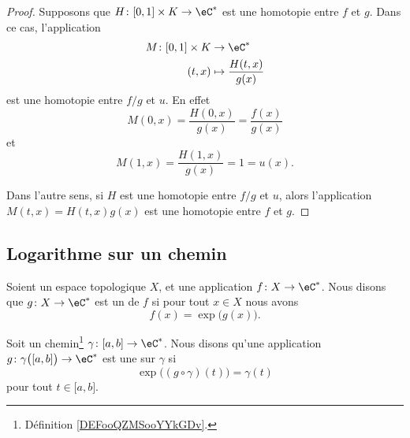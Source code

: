 \begin{proof}
    Supposons que \( H\colon \mathopen[ 0 , 1 \mathclose]\times K\to \eC^*\) est une homotopie entre \( f\) et \( g\). Dans ce cas, l'application
    \begin{equation}
        \begin{aligned}
            M\colon \mathopen[ 0 , 1 \mathclose]\times K&\to \eC^* \\
            (t,x)&\mapsto \frac{ H(t,x) }{ g(x) } 
        \end{aligned}
    \end{equation}
    est une homotopie entre \( f/g\) et \( u\). En effet
    \begin{equation}
        M(0,x)=\frac{ H(0,x) }{ g(x) }=\frac{ f(x) }{ g(x) }
    \end{equation}
    et
    \begin{equation}
        M(1,x)=\frac{ H(1,x) }{ g(x) }=1=u(x).
    \end{equation}

    Dans l'autre sens, si \( H\) est une homotopie entre \( f/g\) et \( u\), alors l'application \( M(t,x)=H(t,x)g(x)\) est une homotopie entre \( f\) et \( g\).
\end{proof}


\subsection{Logarithme sur un chemin}

\begin{definition}
    Soient un espace topologique \( X\), et une application \( f\colon X\to \eC^*\). Nous disons que \( g\colon X\to \eC^*\) est un  de \( f\) si pour tout \( x\in X\) nous avons
    \begin{equation}
        f(x)=\exp\big( g(x) \big).
    \end{equation}
\end{definition}

\begin{definition}     \label{DEFooOCDGooGyvvWi}
    Soit un chemin\footnote{Définition \ref{DEFooQZMSooYYkGDv}.} \( \gamma\colon \mathopen[ a , b \mathclose]\to \eC^*\). Nous disons qu'une application \( g\colon \gamma\big( \mathopen[ a , b \mathclose] \big)\to \eC^*\) est une  sur \( \gamma\) si
    \begin{equation}
        \exp\big( (g\circ\gamma)(t) \big)=\gamma(t)
    \end{equation}
    pour tout \( t\in \mathopen[ a , b \mathclose]\).
\end{definition}

